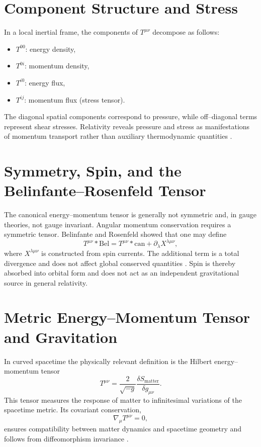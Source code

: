\documentclass[11pt,a4paper]{article}
\begin{document}
\section{Component Structure and Stress}
In a local inertial frame, the components of $T^{\mu\nu}$ decompose as follows:
\begin{itemize}
\item $T^{00}$: energy density,
\item $T^{0i}$: momentum density,
\item $T^{i0}$: energy flux,
\item $T^{ij}$: momentum flux (stress tensor).
\end{itemize}
The diagonal spatial components correspond to pressure, while off--diagonal terms represent shear stresses. Relativity reveals pressure and stress as manifestations of momentum transport rather than auxiliary thermodynamic quantities \cite{Weinberg1972}.

\section{Symmetry, Spin, and the Belinfante--Rosenfeld Tensor}
The canonical energy--momentum tensor is generally not symmetric and, in gauge theories, not gauge invariant. Angular momentum conservation requires a symmetric tensor. Belinfante and Rosenfeld showed that one may define
\begin{equation}
T^{\mu\nu}*{\mathrm{Bel}} = T^{\mu\nu}*{\mathrm{can}} + \partial_\lambda X^{\lambda\mu\nu},
\end{equation}
where $X^{\lambda\mu\nu}$ is constructed from spin currents. The additional term is a total divergence and does not affect global conserved quantities \cite{Belinfante1940,Rosenfeld1940}. Spin is thereby absorbed into orbital form and does not act as an independent gravitational source in general relativity.

\section{Metric Energy--Momentum Tensor and Gravitation}
In curved spacetime the physically relevant definition is the Hilbert energy--momentum tensor
\begin{equation}
T^{\mu\nu} = \frac{2}{\sqrt{-g}} \frac{\delta S_{\mathrm{matter}}}{\delta g_{\mu\nu}}.
\end{equation}
This tensor measures the response of matter to infinitesimal variations of the spacetime metric. Its covariant conservation,
\begin{equation}
\nabla_\mu T^{\mu\nu} = 0,
\end{equation}
ensures compatibility between matter dynamics and spacetime geometry and follows from diffeomorphism invariance \cite{Hilbert1915,Einstein1916}.
\end{document}
